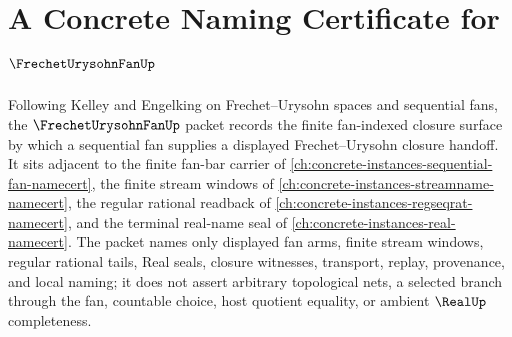 \chapter{A Concrete Naming Certificate for $\FrechetUrysohnFanUp$}
\label{ch:concrete-instances-frechet-urysohn-fan-namecert}

Following Kelley and Engelking on Frechet--Urysohn spaces and sequential fans, the $\FrechetUrysohnFanUp$ packet records the finite fan-indexed closure surface by which a sequential fan supplies a displayed Frechet--Urysohn closure handoff. It sits adjacent to the finite fan-bar carrier of \autoref{ch:concrete-instances-sequential-fan-namecert}, the finite stream windows of \autoref{ch:concrete-instances-streamname-namecert}, the regular rational readback of \autoref{ch:concrete-instances-regseqrat-namecert}, and the terminal real-name seal of \autoref{ch:concrete-instances-real-namecert}. The packet names only displayed fan arms, finite stream windows, regular rational tails, Real seals, closure witnesses, transport, replay, provenance, and local naming; it does not assert arbitrary topological nets, a selected branch through the fan, countable choice, host quotient equality, or ambient $\RealUp$ completeness.

